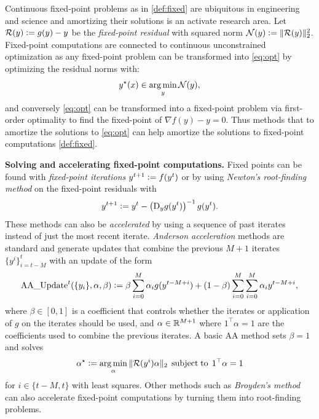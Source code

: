 \documentclass[twoside,11pt]{article}
\begin{document}
Continuous fixed-point problems as in \cref{def:fixed}
are ubiquitous in engineering and science and
amortizing their solutions is an activate research area.
Let ${\mathcal{R}}(y)\vcentcolon= g(y)-y$ be the \emph{fixed-point residual}
with squared norm ${\mathcal{N}}(y)\vcentcolon= \|{\mathcal{R}}(y)\|_2^2$.
Fixed-point computations are connected to continuous
unconstrained optimization as any fixed-point problem can be
transformed into \cref{eq:opt} by optimizing the
residual norms with:
\begin{equation}
  y^\star(x)\in\operatorname*{arg\,min}_y {\mathcal{N}}(y),
  \label{eq:fixed-point-opt}
\end{equation}
and conversely \cref{eq:opt} can be transformed into
a fixed-point problem via first-order optimality
to find the fixed-point of
$\nabla f(y) - y = 0$.
Thus methods that to amortize the solutions to \cref{eq:opt}
can help amortize the solutions
to fixed-point computations \cref{def:fixed}.

\textbf{Solving and accelerating fixed-point computations.}
Fixed points can be found with \emph{fixed-point iterations}
$y^{t+1}\vcentcolon= f(y^t)$ or by using
\emph{Newton's root-finding method} on the
fixed-point residuals with
\begin{equation}
  y^{t+1}\vcentcolon= y^t - \left(\mathrm{D}_y g(y^t)\right)^{-1} g(y^t).
  \label{eq:newton}
\end{equation}
These methods can also be \emph{accelerated} by using
a sequence of past iterates instead of just the most
recent iterate.
\emph{Anderson acceleration} methods
\citep{anderson1965iterative,walker2011anderson,zhang2020globally}
are standard and generate updates that combine the
previous $M+1$ iterates $\{y^i\}_{i=t-M}^t$  with an update of the form
\begin{equation}
  \label{eq:aa-update}
  {\rm AA\_Update}^t(\{y_i\}, \alpha, \beta) \vcentcolon=
  \beta \sum_{i=0}^M \alpha_i g(y^{t-M+i}) +
  (1-\beta)\sum_{i=0}^M\sum_{i=0}^M \alpha_i y^{t-M+i},
\end{equation}
where $\beta\in[0,1]$ is a coefficient that controls
whether the iterates or application of $g$ on the iterates
should be used, and $\alpha\in\mathbb{R}^{M+1}$ where $1^\top\alpha=1$
are the coefficients used to combine the previous iterates.
A basic AA method sets $\beta=1$ and solves
\begin{equation}
  \label{eq:aa-alpha}
  \alpha^\star\vcentcolon= \operatorname*{arg\,min}_\alpha \|{\mathcal{R}}(y^i)\alpha\|_2\; \operatorname*{subject\;to}\; 1^\top \alpha = 1
\end{equation}
for $i\in\{t-M,t\}$ with least squares.
Other methods such as
\emph{Broyden's method} \citep{broyden1965class} can
also accelerate fixed-point computations by turning them
into root-finding problems.
\end{document}
